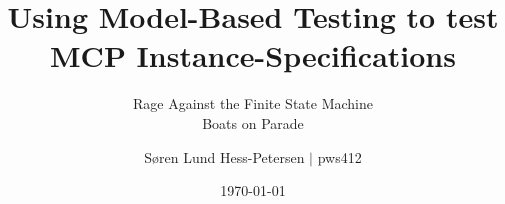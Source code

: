 \documentclass[a4paper,11pt,oneside]{memoir}
\begin{document}

\thesiscomment{} %
\title{Using Model-Based Testing to test MCP Instance-Specifications}
\subtitle{Rage Against the Finite State Machine\\ Boats on Parade} %
\author{Søren Lund Hess-Petersen $|$ pws412}
\date{\today} %

\pagestyle{plain}
\maketitle

\cleardoublepage
{}
\setcounter{page}{3}

\cleardoublepage
\pagestyle{plain}

\begin{abstract}
\TODO{ } 
\end{abstract}

\begin{resume}
\TODO{ } 
\end{resume}



\cleardoublepage
{}
\tableofcontents*

\cleardoublepage
{}
\setcounter{page}{1}





\displayCounterChp



\displayCounterChp
\end{document}
